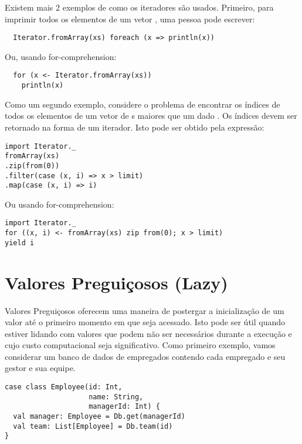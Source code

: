 Existem mais 2 exemplos de como os iteradores são usados. Primeiro, para imprimir todos
os elementos de um vetor , uma pessoa pode escrever:
\begin{lstlisting}
  Iterator.fromArray(xs) foreach (x => println(x))
\end{lstlisting}
Ou, usando for-comprehension:
\begin{lstlisting}
  for (x <- Iterator.fromArray(xs))
    println(x)
\end{lstlisting}
Como um segundo exemplo, considere o problema de encontrar os índices de todos os elementos de um vetor de s maiores que um dado . Os índices devem ser retornado na forma de um iterador.
Isto pode ser obtido pela expressão:
\begin{lstlisting}
import Iterator._
fromArray(xs)
.zip(from(0))
.filter(case (x, i) => x > limit)
.map(case (x, i) => i)
\end{lstlisting}
Ou usando for-comprehension:
\begin{lstlisting}
import Iterator._
for ((x, i) <- fromArray(xs) zip from(0); x > limit)
yield i
\end{lstlisting}

\chapter{Valores Preguiçosos (Lazy)}

Valores Preguiçosos oferecem uma maneira de postergar a inicialização de um valor até o primeiro 
momento em que seja acessado. Isto pode ser útil quando estiver lidando com valores que podem não ser
necessários durante a execução e cujo custo computacional seja significativo. Como primeiro exemplo,
vamos considerar um banco de dados de empregados contendo cada empregado e seu gestor e sua equipe.
\begin{lstlisting}
case class Employee(id: Int, 
                    name: String, 
                    managerId: Int) {
  val manager: Employee = Db.get(managerId)
  val team: List[Employee] = Db.team(id)
}
\end{lstlisting}

